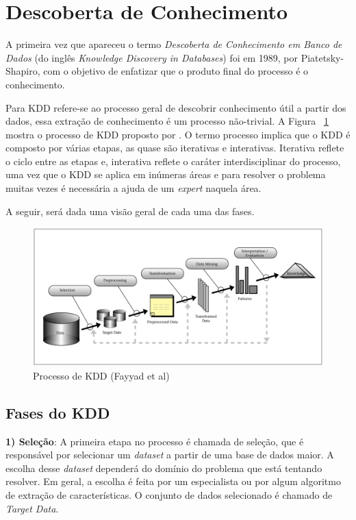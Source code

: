 \section{Descoberta de Conhecimento}
A primeira vez que apareceu o termo \textit{Descoberta de Conhecimento em Banco de Dados} (do inglês \textit{Knowledge Discovery in Databases}) foi em 1989, por Piatetsky-Shapiro, com o objetivo de enfatizar que o produto final do processo é o conhecimento.

Para \cite{fayyad:1996} KDD refere-se ao processo geral de descobrir conhecimento útil a partir dos dados, essa extração de conhecimento é um processo não-trivial. 
A Figura ~\ref{fig:kdd} mostra o processo de KDD proposto por \citeauthor{fayyad:1996}. 
O termo processo implica que o KDD é composto por várias etapas, as quase são iterativas e interativas. 
Iterativa reflete o ciclo entre as etapas e, interativa reflete o caráter interdisciplinar do processo, uma vez que o KDD se aplica em inúmeras áreas e para resolver o problema muitas vezes é necessária a ajuda de um \textit{expert} naquela área.

A seguir, será dada uma visão geral de cada uma das fases.


\begin{figure}
    \centering
    \includegraphics[scale=0.39]{Imagens/kdd.png}
    \caption{Processo de KDD (Fayyad et al)}
    \label{fig:kdd}
\end{figure}

\subsection{Fases do KDD}
\textbf{1) Seleção}: A primeira etapa no processo é chamada de seleção, que é responsável por selecionar um \textit{dataset} a partir de uma base de dados maior. A escolha desse \textit{dataset} dependerá do domínio do problema que está tentando resolver. Em geral, a escolha é feita por um especialista ou por algum algoritmo de extração de características. O conjunto de dados selecionado é chamado de \textit{Target Data}.

